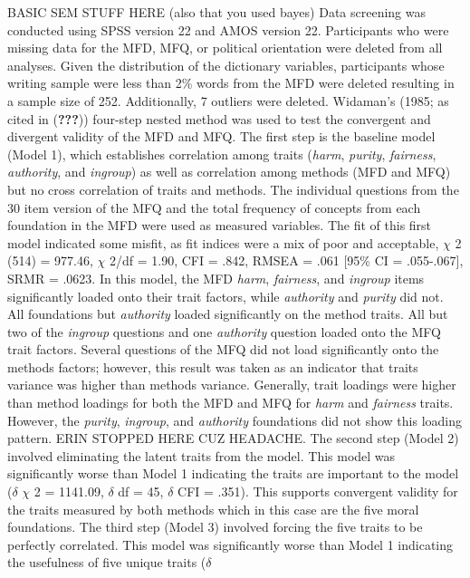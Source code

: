 \documentclass[english,man]{apa6}
\theoremstyle{definition}
\theoremstyle{definition}
\theoremstyle{definition}
\theoremstyle{remark}
\begin{document}
BASIC SEM STUFF HERE (also that you used bayes) Data screening was
conducted using SPSS version 22 and AMOS version 22. Participants who
were missing data for the MFD, MFQ, or political orientation were
deleted from all analyses. Given the distribution of the dictionary
variables, participants whose writing sample were less than 2\% words
from the MFD were deleted resulting in a sample size of 252.
Additionally, 7 outliers were deleted. Widaman's (1985; as cited in
({\textbf{???}})) four-step nested method was used to test the
convergent and divergent validity of the MFD and MFQ. The first step is
the baseline model (Model 1), which establishes correlation among traits
(\emph{harm}, \emph{purity}, \emph{fairness}, \emph{authority}, and
\emph{ingroup}) as well as correlation among methods (MFD and MFQ) but
no cross correlation of traits and methods. The individual questions
from the 30 item version of the MFQ and the total frequency of concepts
from each foundation in the MFD were used as measured variables. The fit
of this first model indicated some misfit, as fit indices were a mix of
poor and acceptable, \(\chi\) 2 (514) = 977.46, \(\chi\) 2/df = 1.90,
CFI = .842, RMSEA = .061 {[}95\% CI = .055-.067{]}, SRMR = .0623. In
this model, the MFD \emph{harm}, \emph{fairness}, and \emph{ingroup}
items significantly loaded onto their trait factors, while
\emph{authority} and \emph{purity} did not. All foundations but
\emph{authority} loaded significantly on the method traits. All but two
of the \emph{ingroup} questions and one \emph{authority} question loaded
onto the MFQ trait factors. Several questions of the MFQ did not load
significantly onto the methods factors; however, this result was taken
as an indicator that traits variance was higher than methods variance.
Generally, trait loadings were higher than method loadings for both the
MFD and MFQ for \emph{harm} and \emph{fairness} traits. However, the
\emph{purity}, \emph{ingroup}, and \emph{authority} foundations did not
show this loading pattern. ERIN STOPPED HERE CUZ HEADACHE. The second
step (Model 2) involved eliminating the latent traits from the model.
This model was significantly worse than Model 1 indicating the traits
are important to the model (\(\delta\) \(\chi\) 2 = 1141.09, \(\delta\)
df = 45, \(\delta\) CFI = .351). This supports convergent validity for
the traits measured by both methods which in this case are the five
moral foundations. The third step (Model 3) involved forcing the five
traits to be perfectly correlated. This model was significantly worse
than Model 1 indicating the usefulness of five unique traits (\(\delta\)
\end{document}
